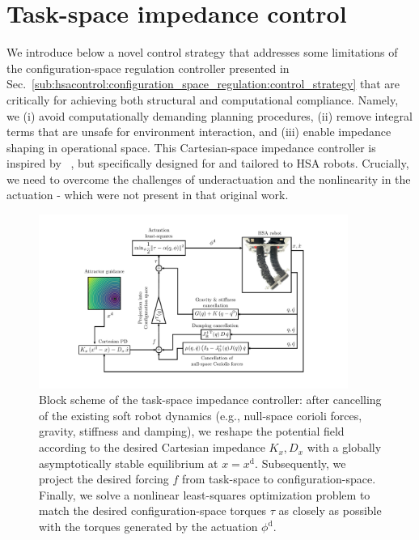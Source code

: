 \section{Task-space impedance control}\label{sec:hsacontrol:task_space_impedance_control}
We introduce below a novel control strategy that addresses some limitations of the configuration-space regulation controller presented in Sec.~\ref{sub:hsacontrol:configuration_space_regulation:control_strategy} that are critically for achieving both structural and computational compliance. Namely, we (i) avoid computationally demanding planning procedures, (ii) remove integral terms that are unsafe for environment interaction, and (iii) enable impedance shaping in operational space. This Cartesian-space impedance controller is inspired by ~\cite{ott2008cartesian,della2020model}, but specifically designed for and tailored to \gls{HSA} robots. Crucially, we need to overcome the challenges of underactuation and the nonlinearity in the actuation - which were not present in that original work. %

\begin{figure}
    \centering
    \includegraphics[width=0.9\textwidth]{hsacontrol/figures/control_schemes/cartesian_impedance_control/control_scheme_without_brain_control_cropped.pdf}
    \caption{Block scheme of the task-space impedance controller: after cancelling of the existing soft robot dynamics (e.g., null-space corioli forces, gravity, stiffness and damping), we reshape the potential field according to the desired Cartesian impedance $K_x, D_x$ with a globally asymptotically stable equilibrium at $x=x^\mathrm{d}$. Subsequently, we project the desired forcing $f$ from task-space to configuration-space. Finally, we solve a nonlinear least-squares optimization problem to match the desired configuration-space torques $\tau$ as closely as possible with the torques generated by the actuation $\phi^\mathrm{d}$.}
    \label{fig:hsacontrol:task_space_impedance_control:block_scheme_closed_loop_control}
\end{figure}

